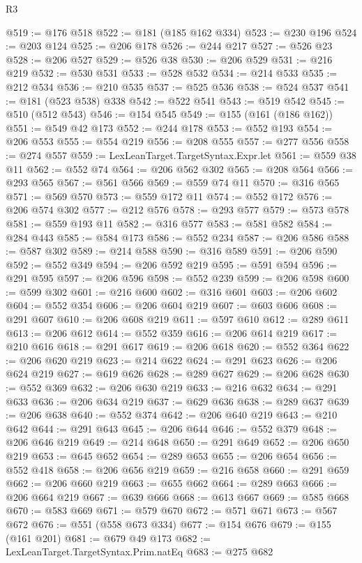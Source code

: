 \begin{lexlean}{R3}
\begin{coremodule}
@519 := @176 @518
@522 := @181 (@185 @162 @334)
@523 := @230 @196
@524 := @203 @124
@525 := @206 @178
@526 := @244 @217
@527 := @526 @23
@528 := @206 @527
@529 := @526 @38
@530 := @206 @529
@531 := @216 @219
@532 := @530 @531
@533 := @528 @532
@534 := @214 @533
@535 := @212 @534
@536 := @210 @535
@537 := @525 @536
@538 := @524 @537
@541 := @181 (@523 @538) @338
@542 := @522 @541
@543 := @519 @542
@545 := @510 (@512 @543)
@546 := @154 @545
@549 := @155 (@161 (@186 @162))
@551 := @549 @42 @173
@552 := @244 @178
@553 := @552 @193
@554 := @206 @553
@555 := @554 @219
@556 := @208 @555
@557 := @277 @556
@558 := @274 @557
@559 := LexLeanTarget.TargetSyntax.Expr.let
@561 := @559 @38 @11
@562 := @552 @74
@564 := @206 @562 @302
@565 := @208 @564
@566 := @293 @565
@567 := @561 @566
@569 := @559 @74 @11
@570 := @316 @565
@571 := @569 @570
@573 := @559 @172 @11
@574 := @552 @172
@576 := @206 @574 @302
@577 := @212 @576
@578 := @293 @577
@579 := @573 @578
@581 := @559 @193 @11
@582 := @316 @577
@583 := @581 @582
@584 := @284 @443
@585 := @584 @173
@586 := @552 @234
@587 := @206 @586
@588 := @587 @302
@589 := @214 @588
@590 := @316 @589
@591 := @206 @590
@592 := @552 @349
@594 := @206 @592 @219
@595 := @591 @594
@596 := @291 @595
@597 := @206 @596
@598 := @552 @239
@599 := @206 @598
@600 := @599 @302
@601 := @216 @600
@602 := @316 @601
@603 := @206 @602
@604 := @552 @354
@606 := @206 @604 @219
@607 := @603 @606
@608 := @291 @607
@610 := @206 @608 @219
@611 := @597 @610
@612 := @289 @611
@613 := @206 @612
@614 := @552 @359
@616 := @206 @614 @219
@617 := @210 @616
@618 := @291 @617
@619 := @206 @618
@620 := @552 @364
@622 := @206 @620 @219
@623 := @214 @622
@624 := @291 @623
@626 := @206 @624 @219
@627 := @619 @626
@628 := @289 @627
@629 := @206 @628
@630 := @552 @369
@632 := @206 @630 @219
@633 := @216 @632
@634 := @291 @633
@636 := @206 @634 @219
@637 := @629 @636
@638 := @289 @637
@639 := @206 @638
@640 := @552 @374
@642 := @206 @640 @219
@643 := @210 @642
@644 := @291 @643
@645 := @206 @644
@646 := @552 @379
@648 := @206 @646 @219
@649 := @214 @648
@650 := @291 @649
@652 := @206 @650 @219
@653 := @645 @652
@654 := @289 @653
@655 := @206 @654
@656 := @552 @418
@658 := @206 @656 @219
@659 := @216 @658
@660 := @291 @659
@662 := @206 @660 @219
@663 := @655 @662
@664 := @289 @663
@666 := @206 @664 @219
@667 := @639 @666
@668 := @613 @667
@669 := @585 @668
@670 := @583 @669
@671 := @579 @670
@672 := @571 @671
@673 := @567 @672
@676 := @551 (@558 @673 @334)
@677 := @154 @676
@679 := @155 (@161 @201)
@681 := @679 @49 @173
@682 := LexLeanTarget.TargetSyntax.Prim.natEq
@683 := @275 @682

\end{coremodule}
\end{lexlean}
